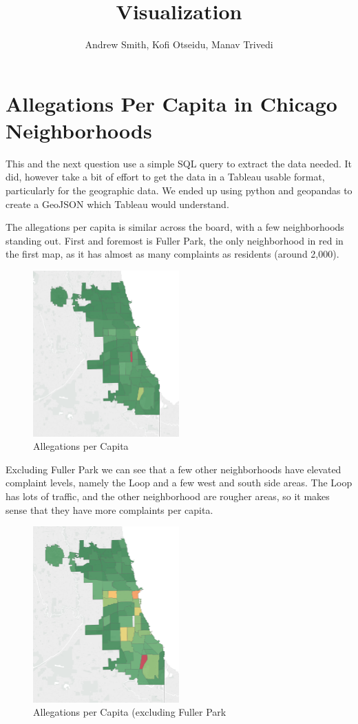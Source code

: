 \documentclass[11pt]{article}
\author{Andrew Smith, Kofi Otseidu, Manav Trivedi}
\title{Visualization}
\begin{document}
\maketitle

\section{Allegations Per Capita in Chicago Neighborhoods}
This and the next question use a simple SQL query to extract the data needed. It did, however take a bit of effort to get the data in a Tableau usable format, particularly for the geographic data. We ended up using python and geopandas to create a GeoJSON which Tableau would understand.

The allegations per capita is similar across the board, with a few neighborhoods standing out. First and foremost is Fuller Park, the only neighborhood in red in the first map, as it has almost as many complaints as residents (around 2,000).

\begin{figure}[h]
\centering
\caption{Allegations per Capita}
\includegraphics[width=0.5\textwidth]{plot1.png}
\end{figure}

Excluding Fuller Park we can see that a few other neighborhoods have elevated complaint levels, namely the Loop and a few west and south side areas. The Loop has lots of traffic, and the other neighborhood are rougher areas, so it makes sense that they have more complaints per capita.

\begin{figure}[h]
\centering
\caption{Allegations per Capita (excluding Fuller Park}
\includegraphics[width=0.5\textwidth]{plot2.png}
\end{figure}
\end{document}
